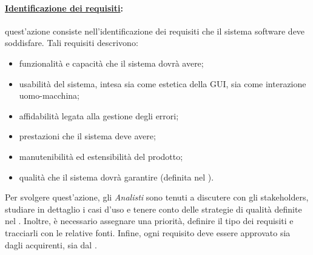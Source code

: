 
\paragraph{\underline{Identificazione dei requisiti}:} quest'azione consiste nell'identificazione dei requisiti che il sistema software deve soddisfare. Tali requisiti descrivono:
\begin{itemize}
\item funzionalità e capacità che il sistema dovrà avere;
\item usabilità del sistema, intesa sia come estetica della GUI\g{}, sia come interazione uomo-macchina;
\item affidabilità legata alla gestione degli errori;
\item prestazioni che il sistema deve avere;
\item manutenibilità ed estensibilità del prodotto;
\item qualità che il sistema dovrà  garantire (definita nel \PdQ{}).
\end{itemize}
Per svolgere quest'azione, gli \textit{Analisti} sono tenuti a discutere con gli stakeholders, studiare in dettaglio i casi d'uso e tenere conto delle strategie di qualità definite nel \PdQ{}. Inoltre, è necessario assegnare una priorità, definire il tipo dei requisiti e tracciarli con le relative fonti. Infine, ogni requisito deve essere approvato sia dagli acquirenti, sia dal \projectManager{}.

